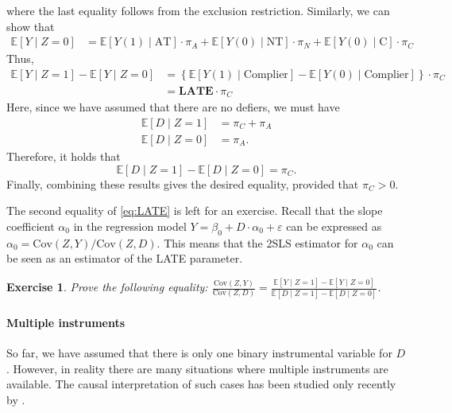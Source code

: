 \documentclass[10.5pt, A4paper, openany, uplatex]{book}
\newcommand{\mbf}{\mathbf}
\newcommand{\eps}{\varepsilon}
\newcommand{\E}{\mathbb{E}}
\newcommand{\Cov}{\mathrm{Cov}}
\newtheorem{exercise}[theorem]{Exercise}
\numberwithin{equation}{section}
\begin{document}
\normalsize
where the last equality follows from the exclusion restriction.
Similarly, we can show that
\begin{align*}
	\E[Y \mid Z = 0]
	& = \E[Y(1) \mid \text{AT} ] \cdot \pi_A + \E[ Y(0) \mid \text{NT} ] \cdot \pi_N  + \E[ Y(0) \mid \text{C} ]  \cdot \pi_C
\end{align*}
Thus, 
\begin{align*}
	\E [ Y \mid Z = 1 ] - \E[ Y \mid Z = 0 ] 
	&= \left\{ \E[ Y(1) \mid \text{Complier} ] - \E[ Y(0) \mid \text{Complier} ] \right\} \cdot \pi_C\\
	& = \mbf{LATE}\cdot\pi_C
\end{align*}
Here, since we have assumed that there are no defiers, we must have
\begin{align*}
	\E[ D \mid Z = 1 ]   &  = \pi_C + \pi_A \\
	\E[ D \mid Z = 0 ]   &  = \pi_A.
\end{align*}
Therefore, it holds that
\begin{equation*}
	\E [D \mid Z = 1 ] - \E[ D \mid Z = 0 ] = \pi_C.
\end{equation*}
Finally, combining these results gives the desired equality, provided that $\pi_C > 0$.

The second equality of \eqref{eq:LATE} is left for an exercise.
Recall that the slope coefficient $\alpha_0$ in the regression model $Y = \beta_0 + D \cdot \alpha_0 + \eps$ can be expressed as $\alpha_0 = \Cov(Z, Y)/\Cov(Z, D)$.
This means that the 2SLS estimator for $\alpha_0$ can be seen as an estimator of the LATE parameter.

\begin{framed}
\begin{exercise}\upshape
	Prove the following equality: $\displaystyle \frac{\Cov(Z, Y)}{\Cov(Z, D)} = \frac{\E[Y \mid Z = 1] - \E[Y \mid Z = 0]}{\E[D \mid Z = 1] - \E[D \mid Z = 0]}$.
\end{exercise}
\end{framed}

\paragraph{Multiple instruments}

So far, we have assumed that there is only one binary instrumental variable for $D$.
However, in reality there are many situations where multiple instruments are available.
The causal interpretation of such cases has been studied only recently by \cite{mogstad2021causal}.
\end{document}

